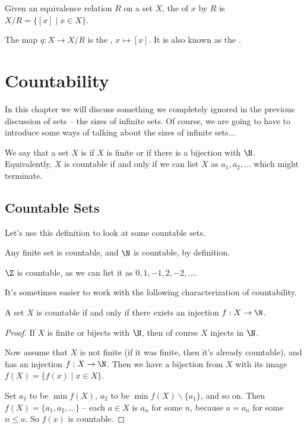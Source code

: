 \begin{definition}
	Given an equivalence relation $R$ on a set $X$, the  of $x$ by $R$ is $X/R = \{[x] \mid x \in X\}$.

	The map $q : X \rightarrow X/R$ is the , $x \mapsto [x]$. It is also known as the .
\end{definition}

\section{Countability}

In this chapter we will discuss something we completely ignored in the previous discussion of sets -- the sizes of infinite sets. Of course, we are going to have to introduce some ways of talking about the sizes of infinite sets...

\begin{definition}[Countability]
	We say that a set $X$ is  if $X$ is finite or if there is a bijection with $\N$. Equivalently, $X$ is countable if and only if we can list $X$ as $a_1, a_2, \dots$ which might terminate.
\end{definition}

\subsection{Countable Sets}

Let's use this definition to look at some countable sets.

\begin{example}
	Any finite set is countable, and $\N$ is countable, by definition.
\end{example}

\begin{example}[$\Z$ is Countable]
	$\Z$ is countable, as we can list it as $0, 1, -1, 2, -2, \dots$.
\end{example}

It's sometimes easier to work with the following characterization of countability.

\begin{proposition}
	A set $X$ is countable if and only if there exists an injection $f : X \rightarrow \N$.
\end{proposition}
\begin{proof}
If $X$ is finite or bijects with $\N$, then of course $X$ injects in $\N$.

Now assume that $X$ is not finite (if it was finite, then it's already countable), and has an injection $f : X \rightarrow \N$. Then we have a bijection from $X$ with its image $f(X) = \{f(x) \mid x \in X \}$. 

Set $a_1$ to be $\min f(X)$, $a_2$ to be $\min f(X) \backslash \{a_1\}$, and so on. Then $f(X) = \{a_1, a_2, \dots \}$ -- each $a \in X$ is $a_n$ for some $n$, because $a = a_n$ for some $n \leq a$.
So $f(x)$ is countable.
\end{proof}


